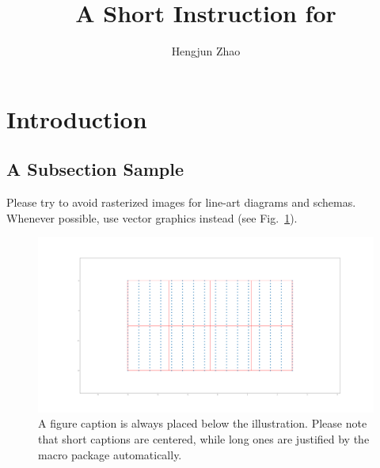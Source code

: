\documentclass{llncs}
\begin{document}
%
\title{A Short Instruction for }
%
%
\author{Hengjun Zhao}

%
\maketitle %
%
%
%
\section{Introduction}
\subsection{A Subsection Sample}

Please \cite{szegedy2013intriguing} try to avoid rasterized images for line-art diagrams and
schemas. Whenever possible, use vector graphics instead (see
Fig.~\ref{fig1}).

\begin{figure}
\includegraphics[width=\textwidth]{./fig/batch_data}
\caption{A figure caption is always placed below the illustration.
Please note that short captions are centered, while long ones are
justified by the macro package automatically.} \label{fig1}
\end{figure}
\end{document}
